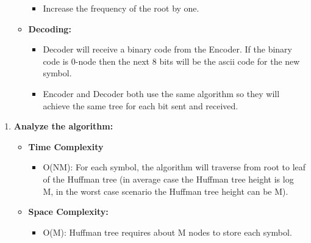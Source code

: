 \begin{enumerate}[label=\textbf{\Alph*.}]
\begin{itemize}
\begin{itemize}
            \item Increase the frequency of the root by one.
        \end{itemize}
        \item \textbf{Decoding:}
        \begin{itemize}
            \item Decoder will receive a binary code from the Encoder. If the binary code is 0-node then the next 8 bits will be the ascii code for the new symbol.
            \item Encoder and Decoder both use the same algorithm so they will achieve the same tree for each bit sent and received.
        \end{itemize}
    \end{itemize}
\end{enumerate}
\begin{enumerate}[label=\textbf{\Alph*.}]
    \item \textbf{Analyze the algorithm:}
    \begin{itemize}
        \item \textbf{Time Complexity}
        \begin{itemize}
            \item O(NM): For each symbol, the algorithm will traverse from root to leaf of the Huffman tree (in average case the Huffman tree height is log M, in the worst case scenario the Huffman tree height can be M).
        \end{itemize}
        \item  \textbf{Space Complexity:}
        \begin{itemize}
            \item O(M): Huffman tree requires about M nodes to store each symbol.
        \end{itemize}
    \end{itemize}
\end{enumerate}
